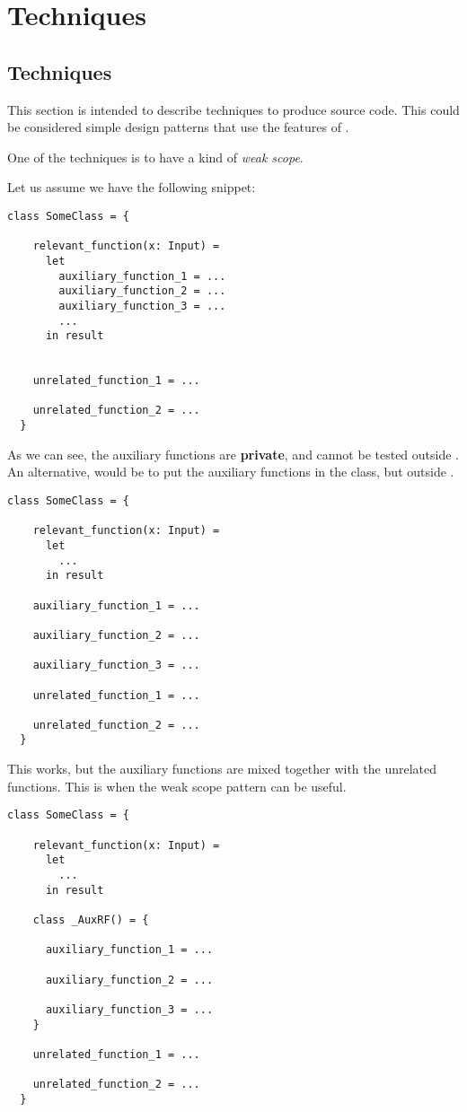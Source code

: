 \chapter{Techniques}

\section{Techniques}

This section is intended to describe techniques to produce \Soda source code.
This could be considered simple design patterns that use the features of \Soda.

One of the techniques is to have a kind of \textit{weak scope}.

Let us assume we have the following snippet:
\begin{lstlisting}[label={lst:techniquesWeakScope0}]
  class SomeClass = {

    relevant_function(x: Input) =
      let
        auxiliary_function_1 = ...
        auxiliary_function_2 = ...
        auxiliary_function_3 = ...
        ...
      in result


    unrelated_function_1 = ...

    unrelated_function_2 = ...
  }
\end{lstlisting}

As we can see, the auxiliary functions are \textbf{private}, and cannot be tested outside .
An alternative, would be to put the auxiliary functions in the class, but outside .

\begin{lstlisting}[label={lst:techniquesWeakScope1}]
  class SomeClass = {

    relevant_function(x: Input) =
      let
        ...
      in result

    auxiliary_function_1 = ...

    auxiliary_function_2 = ...

    auxiliary_function_3 = ...

    unrelated_function_1 = ...

    unrelated_function_2 = ...
  }
\end{lstlisting}

This works, but the auxiliary functions are mixed together with the unrelated functions.
This is when the weak scope pattern can be useful.

\begin{lstlisting}[label={lst:techniquesWeakScope2}]
  class SomeClass = {

    relevant_function(x: Input) =
      let
        ...
      in result

    class _AuxRF() = {

      auxiliary_function_1 = ...

      auxiliary_function_2 = ...

      auxiliary_function_3 = ...
    }

    unrelated_function_1 = ...

    unrelated_function_2 = ...
  }
\end{lstlisting}

